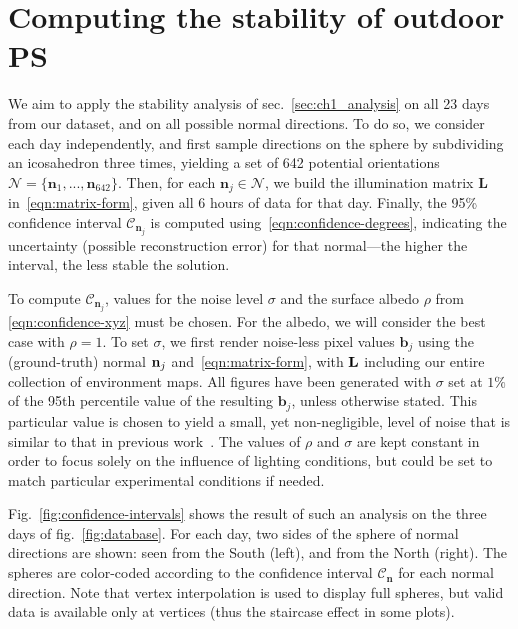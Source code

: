 \section{Computing the stability of outdoor PS}
\label{iccp-computingstability}

We aim to apply the stability analysis of sec.~\ref{sec:ch1_analysis} on all 23 days from our dataset, and on all possible normal directions. To do so, we consider each day independently, and first sample directions on the sphere by subdividing an icosahedron three times, yielding a set of 642 potential orientations $\mathcal{N} = \{\mathbf{n}_1, ..., \mathbf{n}_{642} \}$. Then, for each $\mathbf{n}_j \in \mathcal{N}$, we build the illumination matrix $\mathbf{L}$ in~\eqref{eqn:matrix-form}, given all 6 hours of data for that day. Finally, the 95\% confidence interval $\mathcal{C}_{\mathbf{n}_j}$ is computed using~\eqref{eqn:confidence-degrees}, indicating the uncertainty (possible reconstruction error) for that normal---the higher the interval, the less stable the solution.

To compute $\mathcal{C}_{\mathbf{n}_j}$, values for the noise level $\sigma$ and the surface albedo $\rho$ from \eqref{eqn:confidence-xyz} must be chosen. For the albedo, we will consider the best case with $\rho=1$. To set $\sigma$, we first render noise-less pixel values $\mathbf{b}_j$ using the (ground-truth) normal ${\bf n}_j$ and~\eqref{eqn:matrix-form}, with ${\bf L}$ including our entire collection of environment maps. All figures have been generated with $\sigma$ set at $1\%$ of the 95th percentile value of the resulting $\mathbf{b}_j$, unless otherwise stated. This particular value is chosen to yield a small, yet non-negligible, level of noise that is similar to that in previous work~\cite{klaudiny-prl-14}. The values of $\rho$ and $\sigma$ are kept constant in order to focus solely on the influence of lighting conditions, but could be set to match particular experimental conditions if needed.

Fig.~\ref{fig:confidence-intervals} shows the result of such an analysis on the three days of fig.~\ref{fig:database}. For each day, two sides of the sphere of normal directions are shown: seen from the South (left), and from the North (right). The spheres are color-coded according to the confidence interval $\mathcal{C}_\mathbf{n}$ for each normal direction. Note that vertex interpolation is used to display full spheres, but valid data is available only at vertices (thus the staircase effect in some plots).

